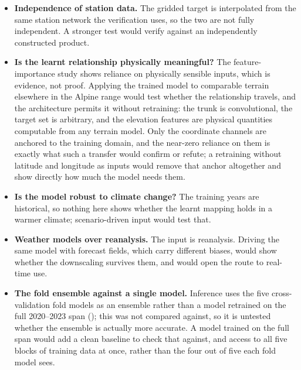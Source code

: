 \begin{itemize}
\item \textbf{Independence of station data.} The gridded target is interpolated from the same station network the verification uses, so the two are not fully independent. A stronger test would verify against an independently constructed product.
\item \textbf{Is the learnt relationship physically meaningful?} The feature-importance study shows reliance on physically sensible inputs, which is evidence, not proof. Applying the trained model to comparable terrain elsewhere in the Alpine range would test whether the relationship travels, and the architecture permits it without retraining: the trunk is convolutional, the target set is arbitrary, and the elevation features are physical quantities computable from any terrain model. Only the coordinate channels are anchored to the training domain, and the near-zero reliance on them is exactly what such a transfer would confirm or refute; a retraining without latitude and longitude as inputs would remove that anchor altogether and show directly how much the model needs them.
\item \textbf{Is the model robust to climate change?} The training years are historical, so nothing here shows whether the learnt mapping holds in a warmer climate; scenario-driven input would test that.
\item \textbf{Weather models over reanalysis.} The input is reanalysis. Driving the same model with forecast fields, which carry different biases, would show whether the downscaling survives them, and would open the route to real-time use.
\item \textbf{The fold ensemble against a single model.} Inference uses the five cross-validation fold models as an ensemble rather than a model retrained on the full 2020--2023 span (); this was not compared against, so it is untested whether the ensemble is actually more accurate. A model trained on the full span would add a clean baseline to check that against, and access to all five blocks of training data at once, rather than the four out of five each fold model sees.
\end{itemize}